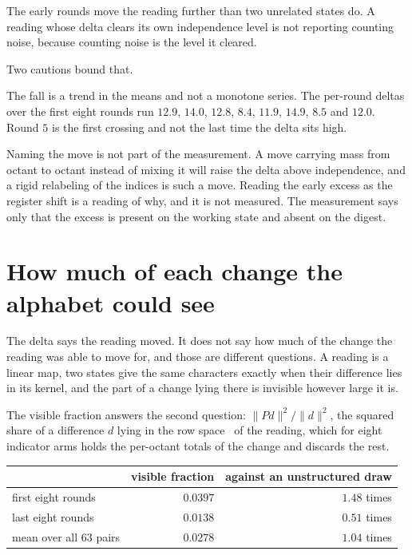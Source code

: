 The early rounds move the reading further than two unrelated states do. A reading whose delta clears its own independence level is not reporting counting noise, because counting noise is the level it cleared.

Two cautions bound that.

The fall is a trend in the means and not a monotone series. The per-round deltas over the first eight rounds run \(12.9\), \(14.0\), \(12.8\), \(8.4\), \(11.9\), \(14.9\), \(8.5\) and \(12.0\). Round \(5\) is the first crossing and not the last time the delta sits high.

Naming the move is not part of the measurement. A move carrying mass from octant to octant instead of mixing it will raise the delta above independence, and a rigid relabeling of the indices is such a move. Reading the early excess as the register shift is a reading of why, and it is not measured. The measurement says only that the excess is present on the working state and absent on the digest.

\section{How much of each change the alphabet could see}

The delta says the reading moved. It does not say how much of the change the reading was able to move for, and those are different questions. A reading is a linear map, two states give the same characters exactly when their difference lies in its kernel, and the part of a change lying there is invisible however large it is.

The visible fraction answers the second question: \(\| P d \|^2 / \| d \|^2\), the squared share of a difference \(d\) lying in the row space~\cite{src:Golub-and-Van-Loan-2013} of the reading, which for eight indicator arms holds the per-octant totals of the change and discards the rest.

\begin{center}
\begin{tabular}{@{}lrr@{}}
\toprule
 & visible fraction & against an unstructured draw \\
\midrule
first eight rounds & \(0.0397\) & \(1.48\) times \\
last eight rounds & \(0.0138\) & \(0.51\) times \\
mean over all 63 pairs & \(0.0278\) & \(1.04\) times \\
\bottomrule
\end{tabular}
\end{center}


